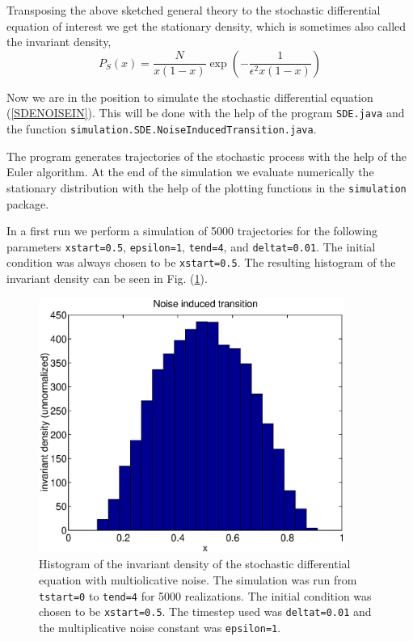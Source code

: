 Transposing the above sketched general theory to the stochastic 
differential equation of interest  we get the stationary density,
which is sometimes also called the invariant density,
\begin{equation*}
P_S(x) = \frac{N}{x(1-x)} \exp\left( - \frac{1}
           {\epsilon^2 x(1-x)}\right)
\end{equation*}

Now we are in the position to simulate the stochastic differential
equation (\ref{SDENOISEIN}). This will be done with the help of 
the program \verb|SDE.java| and the function 
\verb|simulation.SDE.NoiseInducedTransition.java|.


The program generates trajectories of the stochastic process with 
the help of the Euler algorithm. At the end of the simulation we evaluate 
numerically the stationary distribution with the help
of the plotting functions  in the \verb|simulation| package.

In a first run we perform a simulation of 5000 trajectories for 
the following parameters \texttt{xstart=0.5}, \texttt{epsilon=1},
\texttt{tend=4}, and \texttt{deltat=0.01}. The initial condition
was always chosen to be \texttt{xstart=0.5}. The resulting histogram
of the invariant density can be seen in Fig. 
(\ref{F_SDENOISEIN_1}).

\begin{figure}
\label{F_SDENOISEIN_1}
\includegraphics[width=10cm]{./Figures/f_sdenoisein_1.eps}
\caption{Histogram of the invariant density of the stochastic differential 
equation with multiolicative noise. The simulation was run from
\texttt{tstart=0} to \texttt{tend=4} for 5000 realizations.
The initial condition was chosen to be \texttt{xstart=0.5}.
The timestep used was \texttt{deltat=0.01} and the multiplicative noise 
constant was \texttt{epsilon=1}.} 
\end{figure}

